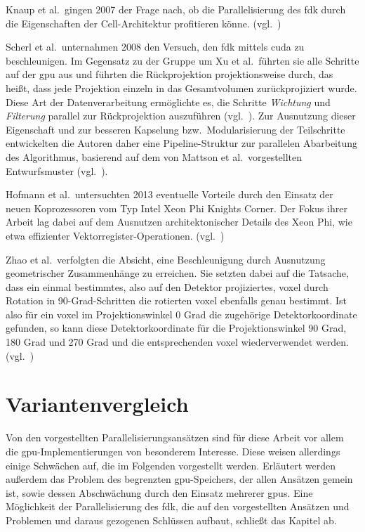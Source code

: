 Knaup et al.\ gingen 2007 der Frage nach, ob die Parallelisierung des \gls{fdk} durch die Eigenschaften der
Cell-Architektur profitieren könne. (vgl.~\cite{knaupsteck})

Scherl et al.\ unternahmen 2008 den Versuch, den \gls{fdk} mittels \gls{cuda} zu beschleunigen. Im Gegensatz zu der
Gruppe um Xu et al.\ führten sie alle Schritte auf der \gls{gpu} aus und führten die Rückprojektion projektionsweise
durch, das heißt, dass jede Projektion einzeln in das Gesamtvolumen zurückprojiziert wurde. Diese Art der
Datenverarbeitung ermöglichte es, die Schritte \textit{Wichtung} und \textit{Filterung} parallel zur Rückprojektion
auszuführen (vgl.~\cite{scherlkeck}). Zur Ausnutzung dieser Eigenschaft und zur besseren Kapselung bzw.\ Modularisierung
der Teilschritte entwickelten die Autoren daher eine Pipeline-Struktur zur parallelen Abarbeitung des Algorithmus,
basierend auf dem von Mattson et al.\ vorgestellten Entwurfsmuster (vgl.~\cite{mattsan}).

Hofmann et al.\ untersuchten 2013 eventuelle Vorteile durch den Einsatz der neuen Koprozessoren vom Typ Intel Xeon Phi
{\glq}Knights Corner{\grq}. Der Fokus ihrer Arbeit lag dabei auf dem Ausnutzen architektonischer Details des Xeon Phi,
wie etwa effizienter Vektorregister-Operationen. (vgl.~\cite{hoftrei})

Zhao et al.\ verfolgten die Absicht, eine Beschleunigung durch Ausnutzung geometrischer Zusammenhänge zu
erreichen. Sie setzten dabei auf die Tatsache, dass ein einmal bestimmtes, also auf den Detektor projiziertes,
\gls{voxel} durch Rotation in 90-Grad-Schritten die rotierten \gls{voxel} ebenfalls genau bestimmt. Ist also für ein
\gls{voxel} im Projektionswinkel 0 Grad die zugehörige Detektorkoordinate gefunden, so kann diese Detektorkoordinate für
die Projektionswinkel 90 Grad, 180 Grad und 270 Grad und die entsprechenden \gls{voxel} wiederverwendet werden.
(vgl.~\cite{zhao})

\section{Variantenvergleich}

Von den vorgestellten Parallelisierungsansätzen sind für diese Arbeit vor allem die \gls{gpu}-Implementierungen von
besonderem Interesse. Diese weisen allerdings einige Schwächen auf, die im Folgenden vorgestellt werden. Erläutert
werden außerdem das Problem des begrenzten \gls{gpu}-Speichers, der allen Ansätzen gemein ist, sowie dessen Abschwächung
durch den Einsatz mehrerer \gls{gpu}s. Eine Möglichkeit der Parallelisierung des \gls{fdk}, die auf den vorgestellten
Ansätzen und Problemen und daraus gezogenen Schlüssen aufbaut, schließt das Kapitel ab.

